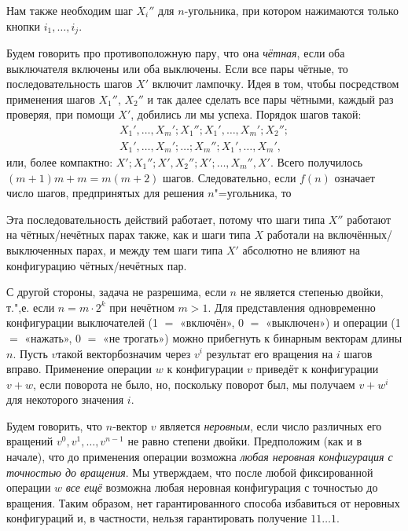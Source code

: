 \documentclass[twoside]{book}
\begin{document}
Нам также необходим шаг $X_i''$ для $n$-угольника, при котором нажимаются только кнопки $i_1,\dots,i_j$.

Будем говорить про противоположную пару, что она \emph{чётная}, если оба выключателя включены или оба выключены.
Если все пары чётные, то последовательность шагов $X'$ включит лампочку.
Идея в том, чтобы посредством применения шагов $X_1''$, $X_2''$ и так далее сделать все пары чётными, каждый раз проверяя, при помощи $X'$, добились ли мы успеха.
Порядок шагов такой:
\begin{align*}
X_1',\dots,X_m';X_1'';X_1',\dots,X_m';X_2'';
\\
X_1',\dots,X_m';\dots ; X_m'';X_1',\dots,X_m',
\end{align*}
или, более компактно: $X';X_1'';X',X_2'';X';\dots,X_m'',X'$.
Всего получилось $(m+1)m+m=m(m+2)$ шагов.
Следовательно, если $f(n)$ означает число шагов, предпринятых для решения $n$"=угольника, то 

Эта последовательность действий работает, потому что шаги типа $X''$ работают на чётных/нечётных парах так\change{}{ }же, как и шаги типа $X$ работали на включённых/выключенных парах, и между тем шаги типа $X'$ абсолютно не влияют на конфигурацию чётных/нечётных пар.
\heart

С другой стороны, задача не разрешима, если $n$ не является степенью двойки, т.",е. если $n=m\cdot 2^k$ при нечётном $m>1$.
Для представления одновременно конфигурации выключателей (1 $=$ «включён», 0 $=$ «выключен») и операции (1 $=$ «нажать», 0 $=$ «не трогать») можно прибегнуть к бинарным векторам длины $n$.
Пусть $v$такой векторбозначим через $v^i$ результат его вращения на $i$ шагов вправо.
Применение операции $w$ к конфигурации $v$ приведёт к конфигурации $v+w$, если поворота не было, но, поскольку поворот был, мы получаем $v+w^i$ для некоторого значения $i$.

Будем говорить, что $n$-вектор $v$ является \emph{неровным}, %
если число различных его вращений $v^0,v^1,\dots,v^{n-1}$ не равно степени двойки.
Предположим (как и в начале), что до применения операции возможна \emph{любая неровная конфигурация с точностью до вращения}.
Мы утверждаем, что после любой фиксированной операции $w$ \emph{все ещё} возможна любая неровная конфигурация с точностью до вращения.
Таким образом, нет гарантированного способа избавиться от неровных конфигураций и, в частности, нельзя гарантировать получение $11\dots1$.
\end{document}
